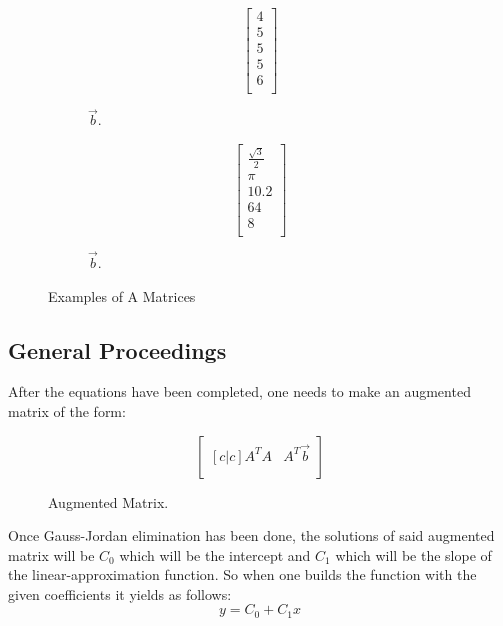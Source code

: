 \documentclass[letterpaper, conference]{IEEEtran}
\begin{document}
		\begin{figure}[H]
			\centering
			\begin{subfigure}{.2\textwidth}
				\[
				\begin{bmatrix}
				4  \\
				5  \\
				5  \\
				5  \\
				6  \\
				\end{bmatrix}
				\]
				\caption{$\vec{b}$.}
				\label{figure3}
			\end{subfigure}
			\begin{subfigure}{.2\textwidth}
				\centering
				\[
				\begin{bmatrix}
				\frac{\sqrt{3}}{2}  \\
				\pi \\
				10.2 \\
				64	    \\
				8 \\
				\end{bmatrix}
				\]
				\caption{$\vec{b}$.}
				\label{figure4}
			\end{subfigure}
		\caption{Examples of A Matrices}
		\end{figure}
		
		\subsection{General Proceedings}
			After the equations have been completed, one needs to make an augmented matrix of the form:
			\begin{figure}[H]
				\centering
				\[
				\begin{bmatrix}[c|c ]
					A^T A & A^T \vec{b} \\
				\end{bmatrix}
				\]
				\caption{Augmented Matrix.}
				\label{figure5}
			\end{figure}
			Once Gauss-Jordan elimination has been done, the solutions of said augmented matrix will be $C_{0}$ which will be the intercept and $C_{1}$ which will be the slope of the linear-approximation function. So when one builds the function with the given coefficients it yields as follows:
			\begin{equation}
			y = C_{0} + C_{1}x \label{augmented equation}
			\end{equation}
		
\end{document}
